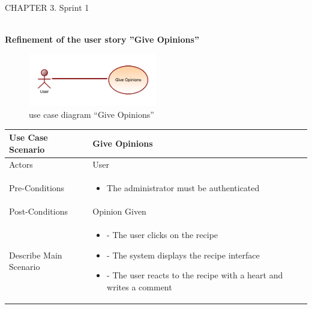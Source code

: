 \documentclass{article}
\begin{document}
{{{{%
\newpage
\noindent
CHAPTER 3.  Sprint 1 \\
\underline{\hspace{\textwidth}} \vspace{0.2cm}\\
{\large \textbf{Refinement of the user story ”Give Opinions”}
\begin{figure}[htbp]
    \centering
    \includegraphics[width=0.5\textwidth]{opin}
    \caption{use case diagram “Give Opinions”}
    \label{fig:design2}
\end{figure}
\begin{table}[h]
    \centering
    \begin{tabularx}{\textwidth}{X|X}
        \toprule
        Use Case Scenario & Give Opinions \\
        \midrule
        Actors & User \\
        \midrule
        Pre-Conditions & \begin{itemize}[label=$\bullet$]
            \item The administrator must be authenticated
           
        \end{itemize} \\
        \midrule
        Post-Conditions & Opinion Given  \\
        \midrule
        Describe Main Scenario &  \begin{itemize}[label=$\bullet$]
            \item - The user clicks on the recipe
            \item- The system displays the recipe interface
	\item- The user reacts to the recipe with a heart and writes a comment
           

\end{itemize}
\end{tabularx}
\end{table}}}}}}
\end{document}
